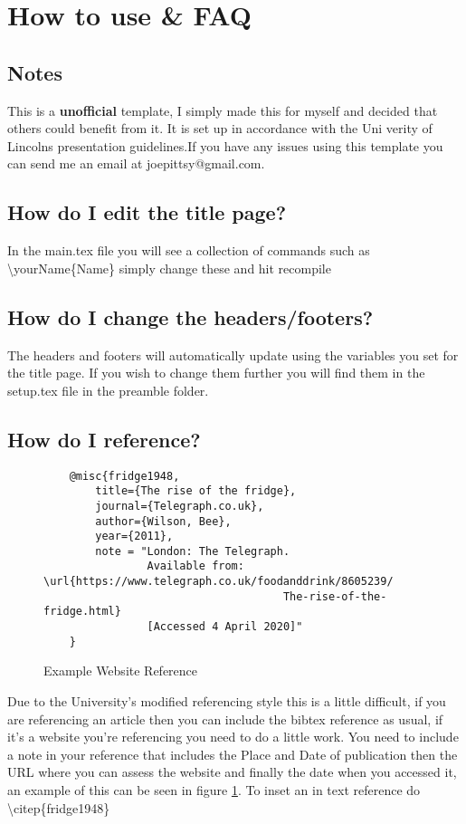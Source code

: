 \section{How to use \& FAQ}
\subsection{Notes}
This is a \textbf{unofficial} template, I simply made this for myself and decided that others could benefit from it. It is set up in accordance with the Uni verity of Lincolns presentation guidelines.If you have any issues using this template you can send me an email at joepittsy@gmail.com. 

\subsection{How do I edit the title page?}
In the main.tex file you will see a collection of commands such as \textbackslash yourName\{Name\} simply change these and hit recompile

\subsection{How do I change the headers/footers?}
The headers and footers will automatically update using the variables you set for the title page. If you wish to change them further you will find them in the setup.tex file in the preamble folder.

\subsection{How do I reference?}
\begin{figure}[!htb]
    \begin{verbatim}
    @misc{fridge1948,
        title={The rise of the fridge},
        journal={Telegraph.co.uk},
        author={Wilson, Bee},
        year={2011},
        note = "London: The Telegraph.
                Available from: \url{https://www.telegraph.co.uk/foodanddrink/8605239/
                                     The-rise-of-the-fridge.html}
                [Accessed 4 April 2020]"
    }
    \end{verbatim}
    \caption{Example Website Reference}
    \label{fig:refExample}
\end{figure}

Due to the University's modified referencing style this is a little difficult, if you are referencing an article then you can include the bibtex reference as usual, if it's a website you're referencing you need to do a little work. You need to include a note in your reference that includes the Place and Date of publication then the URL where you can assess the website and finally the date when you accessed it, an example of this can be seen in figure \ref{fig:refExample}. To inset an in text reference do \textbackslash citep\{fridge1948\}\citep{fridge1948}

